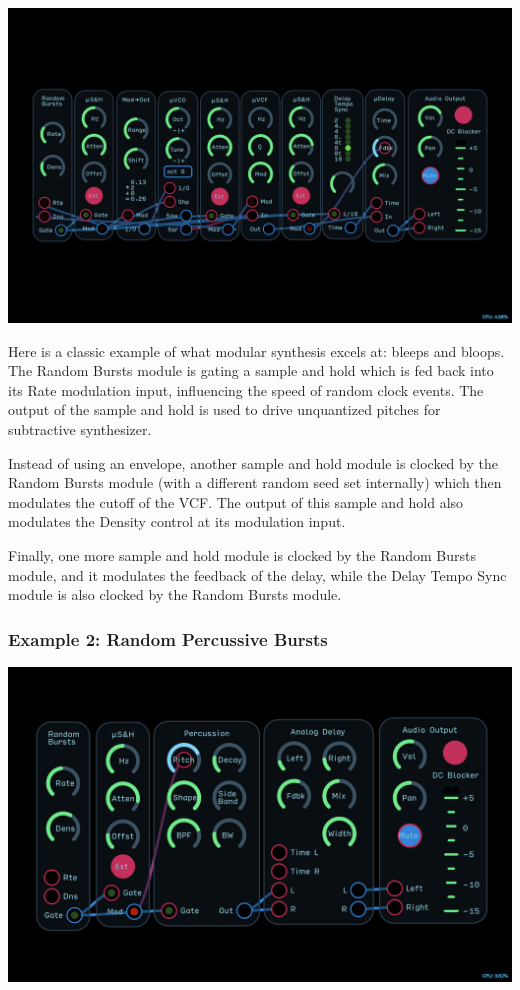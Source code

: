 \documentclass[11pt]{book}
\begin{document}
\begin{multicols*}{2}
\begin{center}
\includegraphics[width=0.95\linewidth]{random-bursts-fig2.png}
\end{center}

Here is a classic example of what modular synthesis excels at: bleeps and bloops. The Random Bursts module is gating a sample and hold which is fed back into its Rate modulation input, influencing the speed of random clock events. The output of the sample and hold is used to drive unquantized pitches for subtractive synthesizer.

Instead of using an envelope, another sample and hold module is clocked by the Random Bursts module (with a different random seed set internally) which then modulates the cutoff of the VCF. The output of this sample and hold also modulates the Density control at its modulation input.

Finally, one more sample and hold module is clocked by the Random Bursts module, and it modulates the feedback of the delay, while the Delay Tempo Sync module is also clocked by the Random Bursts module.

\subsubsection*{Example 2: Random Percussive Bursts}

\begin{center}
\includegraphics[width=0.95\linewidth]{random-bursts-fig3.png}
\end{center}


\end{multicols*}
\end{document}
